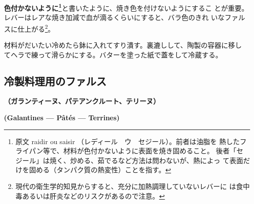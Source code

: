 \begin{recette}
\textbf{色付かないように\footnote{原文 raidir ou saisir
  （レディール　ウ　セジール）。前者は油脂を
  熱したフライパン等で、材料が色付かないように表面を焼き固めること。
  後者「セジール」は焼く、炒める、茹でるなど方法は問わないが、熱によっ
  て表面だけを固める（タンパク質の熱変性）ことを指す。}}と書いたように、焼き色を付けないようにするこ
とが重要。レバーはレアな焼き加減で血が滴るくらいにすると、バラ色のきれ
いなファルスに仕上がる\footnote{現代の衛生学的知見からすると、充分に加熱調理していないレバーに
  は食中毒あるいは肝炎などのリスクがあるので注意。}。

材料がだいたい冷めたら鉢に入れてすり潰す。裏漉しして、陶製の容器に移し
てヘラで練って滑らかにする。バターを塗った紙で蓋をして冷蔵する。
\end{recette}
\hypertarget{farce-pour-les-pieces-froides}{%
\subsection{冷製料理用のファルス}\label{farce-pour-les-pieces-froides}}

\vspace{-1\zw}
\begin{center}
\textbf{（ガランティーヌ、パテアンクルート、テリーヌ）}
\end{center}
\begin{center}
\vspace{-1\zw}
\hspace{1\zw}\textbf{(Galantines --- Pâtés --- Terrines)}
\end{center}


